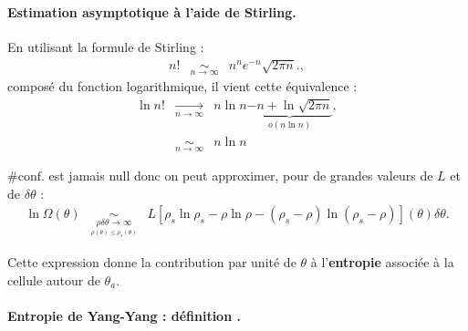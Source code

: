 \paragraph{Estimation asymptotique à l’aide de Stirling.}

En utilisant la formule de Stirling :
\begin{eqnarray}
	n! & \underset{n \to \infty}{\sim} &  n^n e^{-n} \sqrt{2\pi n}.,
\end{eqnarray}	
composé du fonction logarithmique, il vient cette équivalence : 
\begin{eqnarray}
	\ln n! & \underset{n \to \infty}{\rightarrow} & n \ln n \underbrace{- n + \ln \sqrt{2 \pi n }}_{o \left ( n \ln n \right ) } ,\\
	&  \underset{n \to \infty}{\sim} & n \ln n  
\end{eqnarray}
	
$\# \mbox{conf.}$ est jamais null donc on peut approximer, pour de grandes valeurs de $L$ et de $\delta\theta$  : 
\begin{eqnarray}
    \ln \Omega(\theta) & \underset{\underset{\rho (\theta )\leq  \rho_s (\theta )}{\rho \delta \theta  \to \infty}}{\sim}   & L [ \rho_s\ln \rho_s - \rho \ln \rho - (\rho_s - \rho ) \ln ( \rho_s - \rho) ] (\theta )\delta \theta .
\end{eqnarray}

Cette expression donne la contribution par unité de $\theta$ à l’{\bf entropie}  associée à la cellule autour de $\theta_a$.

\paragraph{Entropie de Yang-Yang : définition .}


